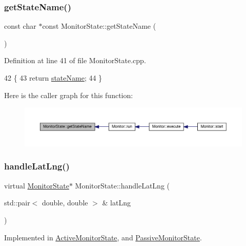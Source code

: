\subsubsection{\texorpdfstring{get\+State\+Name()}{getStateName()}}
{\footnotesize\ttfamily const char $\ast$const Monitor\+State\+::get\+State\+Name (\begin{DoxyParamCaption}{ }\end{DoxyParamCaption})}



Definition at line 41 of file Monitor\+State.\+cpp.


\begin{DoxyCode}
42 \{
43     \textcolor{keywordflow}{return} \hyperlink{class_monitor_state_aaeef0ae307bb9cfcbb4fcb08c115fb0f}{stateName};
44 \}
\end{DoxyCode}
Here is the caller graph for this function\+:
\nopagebreak
\begin{figure}[H]
\begin{center}
\leavevmode
\includegraphics[width=350pt]{dd/d45/class_monitor_state_acb6d3a4de174058cb5b167fc04929ddb_icgraph}
\end{center}
\end{figure}
\mbox{\label{class_monitor_state_a8c8b871e3e8308e11f35905dd8741878}} 
\subsubsection{\texorpdfstring{handle\+Lat\+Lng()}{handleLatLng()}}
{\footnotesize\ttfamily virtual \hyperlink{class_monitor_state}{Monitor\+State}$\ast$ Monitor\+State\+::handle\+Lat\+Lng (\begin{DoxyParamCaption}\item[{std\+::pair$<$ double, double $>$ \&}]{lat\+Lng }\end{DoxyParamCaption})\hspace{0.3cm}{\ttfamily [pure virtual]}}



Implemented in \hyperlink{class_active_monitor_state_a0eb7622ad3aa4d372d90589838cb50a9}{Active\+Monitor\+State}, and \hyperlink{class_passive_monitor_state_a173a7c8a4d0b8ecea5928e0c90dec26b}{Passive\+Monitor\+State}.

